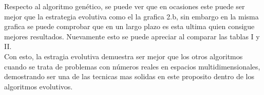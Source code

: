 \documentclass[twocolumn]{IEEEtran}
\begin{document}
Respecto al algoritmo genético, se puede ver que en ocasiones este puede ser mejor que la
estrategia evolutiva como el la grafica 2.b, sin embargo en la misma 
grafica se puede comprobar que en un largo plazo es esta ultima quien consigue mejores resultados.
Nuevamente esto se puede apreciar al comparar las tablas I y
II. \\

Con esto, la estragia evolutiva demuestra ser mejor que los otros algoritmos cuando se trata de 
problemas con números reales en espacios multidimensionales, demostrando ser una de las tecnicas
mas solidas en este proposito dentro de los algoritmos evolutivos.

    
\end{document}
